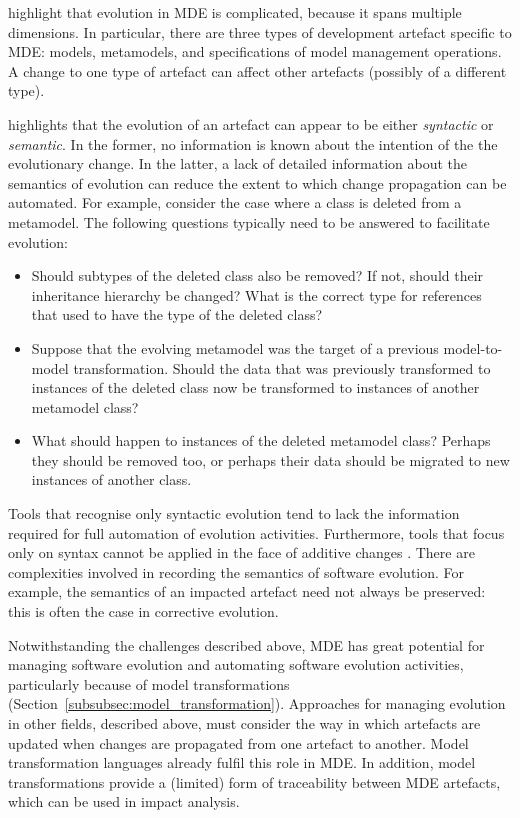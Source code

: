 \cite{deursen07mdse} highlight that evolution in MDE is complicated, because it spans multiple dimensions. In particular, there are three types of development artefact specific to MDE: models, metamodels, and specifications of model management operations. A change to one type of artefact can affect other artefacts (possibly of a different type). 

\cite{sprinkle04domain} highlights that the evolution of an artefact can appear to be either \emph{syntactic} or \emph{semantic}. In the former, no information is known about the intention of the the evolutionary change. In the latter, a lack of detailed information about the semantics of evolution can reduce the extent to which change propagation can be automated. For example, consider the case where a class is deleted from a metamodel. The following questions typically need to be answered to facilitate evolution:
 \begin{itemize}
  \item Should subtypes of the deleted class also be removed? If not, should their inheritance hierarchy be changed? What is the correct type for references that used to have the type of the deleted class?
  \item Suppose that the evolving metamodel was the target of a previous model-to-model transformation. Should the data that was previously transformed to instances of the deleted class now be transformed to instances of another metamodel class?
  \item What should happen to instances of the deleted metamodel class? Perhaps they should be removed too, or perhaps their data should be migrated to new instances of another class.
 \end{itemize}

Tools that recognise only syntactic evolution tend to lack the information required for full automation of evolution activities. Furthermore, tools that focus only on syntax cannot be applied in the face of additive changes \cite{gruschko07towards}. There are complexities involved in recording the semantics of software evolution. For example, the semantics of an impacted artefact need not always be preserved: this is often the case in corrective evolution.

Notwithstanding the challenges described above, MDE has great potential for managing software evolution and automating software evolution activities, particularly because of model transformations (Section~\ref{subsubsec:model_transformation}). Approaches for managing evolution in other fields, described above, must consider the way in which artefacts are updated when changes are propagated from one artefact to another. Model transformation languages already fulfil this role in MDE. In addition, model transformations provide a (limited) form of traceability between MDE artefacts, which can be used in impact analysis.

